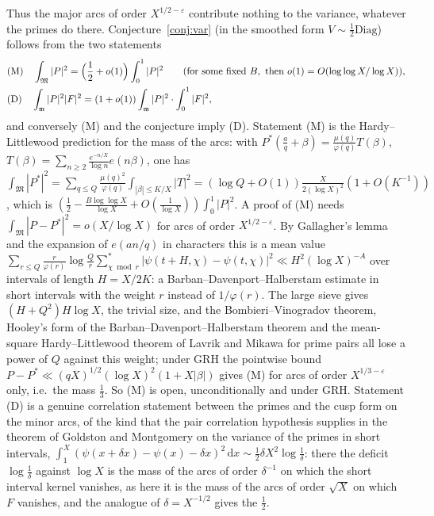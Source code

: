 ﻿\documentclass[11pt]{amsart}
\theoremstyle{remark}
\newcommand{\dd}{\,\mathrm d}
\newcommand{\e}{\varepsilon}
\begin{document}
Thus the major arcs of order $X^{1/2-\e}$ contribute nothing to the variance, whatever the primes do there. Conjecture~\ref{conj:var} (in the smoothed form $V\sim\frac12\mathrm{Diag}$) follows from the two statements
\begin{align*}
&\textup{(M)}\quad \int_{\mathfrak M}|P|^2=\Bigl(\frac12+o(1)\Bigr)\int_0^1|P|^2\qquad(\text{for some fixed }B,\ \text{then }o(1)=O(\log\log X/\log X)),\\
&\textup{(D)}\quad \int_{\mathfrak m}|P|^2|F|^2=(1+o(1))\int_{\mathfrak m}|P|^2\cdot\int_0^1|F|^2,
\end{align*}
and conversely (M) and the conjecture imply (D). Statement (M) is the Hardy--Littlewood prediction for the mass of the arcs: with $P^*(\frac aq+\beta)=\frac{\mu(q)}{\varphi(q)}T(\beta)$, $T(\beta)=\sum_{n\ge2}\frac{e^{-n/X}}{\log n}e(n\beta)$, one has $\int_{\mathfrak M}|P^*|^2=\sum_{q\le Q}\frac{\mu(q)^2}{\varphi(q)}\int_{|\beta|\le K/X}|T|^2=(\log Q+O(1))\frac X{2(\log X)^2}(1+O(K^{-1}))$, which is $(\frac12-\frac{B\log\log X}{\log X}+O(\frac1{\log X}))\int_0^1|P|^2$. A proof of (M) needs $\int_{\mathfrak M}|P-P^*|^2=o(X/\log X)$ for arcs of order $X^{1/2-\e}$. By Gallagher's lemma and the expansion of $e(an/q)$ in characters this is a mean value $\sum_{r\le Q}\frac r{\varphi(r)}\log\frac Qr\sum_{\chi\bmod r}^*|\psi(t+H,\chi)-\psi(t,\chi)|^2\ll H^2(\log X)^{-A}$ over intervals of length $H=X/2K$: a Barban--Davenport--Halberstam estimate in short intervals with the weight $r$ instead of $1/\varphi(r)$. The large sieve gives $(H+Q^2)H\log X$, the trivial size, and the Bombieri--Vinogradov theorem, Hooley's form of the Barban--Davenport--Halberstam theorem and the mean-square Hardy--Littlewood theorem of Lavrik and Mikawa for prime pairs all lose a power of $Q$ against this weight; under GRH the pointwise bound $P-P^*\ll(qX)^{1/2}(\log X)^2(1+X|\beta|)$ gives (M) for arcs of order $X^{1/3-\e}$ only, i.e.\ the mass $\frac13$. So (M) is open, unconditionally and under GRH. Statement (D) is a genuine correlation statement between the primes and the cusp form on the minor arcs, of the kind that the pair correlation hypothesis supplies in the theorem of Goldston and Montgomery \cite{GM} on the variance of the primes in short intervals, $\int_1^X(\psi(x+\delta x)-\psi(x)-\delta x)^2\dd x\sim\frac12\delta X^2\log\frac1\delta$: there the deficit $\log\frac1\delta$ against $\log X$ is the mass of the arcs of order $\delta^{-1}$ on which the short interval kernel vanishes, as here it is the mass of the arcs of order $\sqrt X$ on which $F$ vanishes, and the analogue of $\delta=X^{-1/2}$ gives the $\frac12$.
\end{document}
